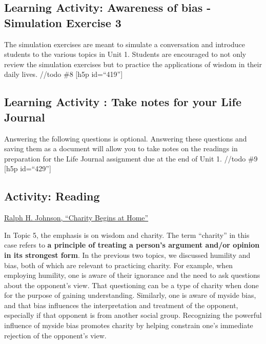 \documentclass[
]{book}
\begin{document}
\begin{reflect}
\end{reflect}

\hypertarget{learning-activity-awareness-of-bias---simulation-exercise-3}{%
\subsection{Learning Activity: Awareness of bias - Simulation Exercise 3}\label{learning-activity-awareness-of-bias---simulation-exercise-3}}

The simulation exercises are meant to simulate a conversation and introduce students to the various topics in Unit 1. Students are encouraged to not only review the simulation exercises but to practice the applications of wisdom in their daily lives.
//todo \#8
{[}h5p id=``419''{]}

\hypertarget{learning-activity-take-notes-for-your-life-journal-3}{%
\subsection{Learning Activity : Take notes for your Life Journal}\label{learning-activity-take-notes-for-your-life-journal-3}}

Answering the following questions is optional. Answering these questions and saving them as a document will allow you to take notes on the readings in preparation for the Life Journal assignment due at the end of Unit 1.
//todo \#9
{[}h5p id=``429''{]}

\hypertarget{activity-reading-3}{%
\subsection*{Activity: Reading}\label{activity-reading-3}}

\begin{reflect}
\href{assets/u1/CharityBeginsatHome.pdf}{Ralph H. Johnson, ``Charity Begins at Home''}
\end{reflect}

In Topic 5, the emphasis is on wisdom and charity. The term ``charity'' in this case refers to \textbf{a principle of treating a person's argument and/or opinion in its strongest form}. In the previous two topics, we discussed humility and bias, both of which are relevant to practicing charity. For example, when employing humility, one is aware of their ignorance and the need to ask questions about the opponent's view. That questioning can be a type of charity when done for the purpose of gaining understanding. Similarly, one is aware of myside bias, and that bias influences the interpretation and treatment of the opponent, especially if that opponent is from another social group. Recognizing the powerful influence of myside bias promotes charity by helping constrain one's immediate rejection of the opponent's view.
\end{document}
